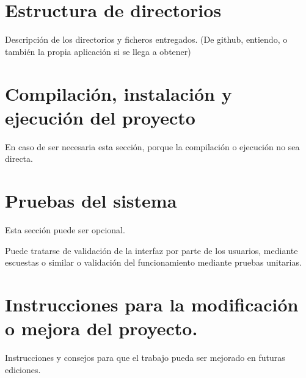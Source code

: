 
\section{Estructura de directorios}

Descripción de los directorios y ficheros entregados. (De github, entiendo, o también la propia aplicación si se llega a obtener)

\section{Compilación, instalación y ejecución del proyecto}

En caso de ser necesaria esta sección, porque la compilación o ejecución no sea directa.


\section{Pruebas del sistema}
Esta sección puede ser opcional.

Puede tratarse de validación de la interfaz por parte de los usuarios, mediante escuestas o similar o validación del funcionamiento mediante pruebas unitarias.



\section{Instrucciones para la modificación o mejora del proyecto.}

Instrucciones y consejos para que el trabajo pueda ser mejorado en futuras ediciones.